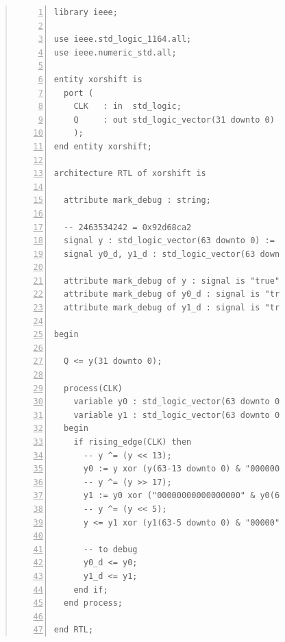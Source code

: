 \documentclass[a4paper,dvipdfmx]{jsarticle}
\begin{document}
\begin{figure}[H]
\begin{quote}
\begin{Verbatim}[frame=single, numbers=left, baselinestretch=0.8]
library ieee;

use ieee.std_logic_1164.all;
use ieee.numeric_std.all;

entity xorshift is
  port (
    CLK   : in  std_logic;
    Q     : out std_logic_vector(31 downto 0)
    );
end entity xorshift;

architecture RTL of xorshift is

  attribute mark_debug : string;

  -- 2463534242 = 0x92d68ca2
  signal y : std_logic_vector(63 downto 0) := X"0000000092d68ca2";
  signal y0_d, y1_d : std_logic_vector(63 downto 0);

  attribute mark_debug of y : signal is "true";
  attribute mark_debug of y0_d : signal is "true";
  attribute mark_debug of y1_d : signal is "true";
  
begin

  Q <= y(31 downto 0);

  process(CLK)
    variable y0 : std_logic_vector(63 downto 0);
    variable y1 : std_logic_vector(63 downto 0);
  begin
    if rising_edge(CLK) then
      -- y ^= (y << 13);
      y0 := y xor (y(63-13 downto 0) & "0000000000000");
      -- y ^= (y >> 17);
      y1 := y0 xor ("00000000000000000" & y0(63 downto 17));
      -- y ^= (y << 5);
      y <= y1 xor (y1(63-5 downto 0) & "00000");
      
      -- to debug
      y0_d <= y0;
      y1_d <= y1;
    end if;
  end process;
  
end RTL;
\end{Verbatim}
\end{quote}
\end{figure}
\end{document}
